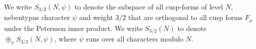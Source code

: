 \documentclass{amsart}
\newtheorem{proposition}[theorem]{Proposition}
\numberwithin{equation}{section}
\theoremstyle{remark}
\theoremstyle{plain} %
\begin{document}
We write $S_{3/2}(N,\psi)$ to denote the subspace of all cusp-forms of level $N$, nebentypus character $\psi$ and weight $3/2$ that are orthogonal to all cusp forms $F_\rho$ under the Petersson inner product.
We write $S_{3/2}(N)$ to denote $\oplus_\psi S_{3/2}(N,\psi)$, where $\psi$ runs over all characters modulo $N$.

\end{document}
